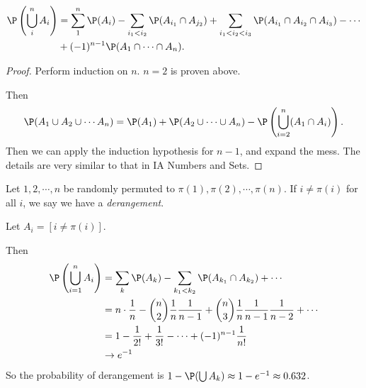 \documentclass[a4paper]{article}
\begin{document}
\begin{thm}
  \begin{align*}
    \P\left(\bigcup_i^n A_i\right) &= \sum_1^n \P(A_i) - \sum_{i_1 < i_2} \P(A_{i_1}\cap A_{j_2}) + \sum_{i_1 < i_2 < i_3}\P(A_{i_1}\cap A_{i_2} \cap A_{i_3}) - \cdots\\
    &+ (-1)^{n - 1} \P(A_1\cap \cdots \cap A_n).
  \end{align*}
\end{thm}

\begin{proof}
  Perform induction on $n$. $n = 2$ is proven above.

  Then
  \[
    \P(A_1\cup A_2\cup \cdots A_n) = \P(A_1) + \P(A_2\cup\cdots\cup A_n) - \P\left(\bigcup_{i = 2}^n (A_1\cap A_i)\right).
  \]
  Then we can apply the induction hypothesis for $n - 1$, and expand the mess. The details are very similar to that in IA Numbers and Sets.
\end{proof}

\begin{eg}
  Let $1, 2, \cdots, n$ be randomly permuted to $\pi(1), \pi(2), \cdots, \pi(n)$. If
  $i \not= \pi(i)$ for all $i$, we say we have a \emph{derangement}.

  Let $A_i = [i \not= \pi(i)]$.

  Then
  \begin{align*}
    \P\left(\bigcup _{i = 1}^n A_i\right) &= \sum_{k} \P(A_k) - \sum_{k_1 < k_2} \P(A_{k_1} \cap A_{k_2}) + \cdots\\
    &= n\cdot \frac{1}{n} - \binom{n}{2}\frac{1}{n}\frac{1}{n - 1} + \binom{n}{3}\frac{1}{n}\frac{1}{n - 1}\frac{1}{n - 2} + \cdots\\
    &= 1 - \frac{1}{2!} + \frac{1}{3!} - \cdots + (-1)^{n - 1}\frac{1}{n!}\\
    &\to e^{-1}
  \end{align*}
  So the probability of derangement is $1 - \P(\bigcup A_k) \approx 1 - e^{-1}\approx 0.632$.
\end{eg}
\end{document}
